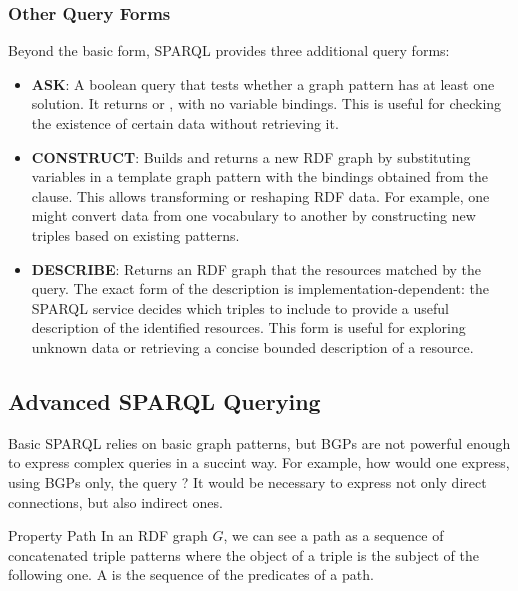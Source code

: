 \subsubsection{Other Query Forms}
Beyond the basic  form, SPARQL provides three additional query forms:

\begin{itemize}
    \item \textbf{ASK}: A boolean query that tests whether a graph pattern has at least one solution. It returns  or , with no variable bindings. This is useful for checking the existence of certain data without retrieving it.
    
    \item \textbf{CONSTRUCT}: Builds and returns a new RDF graph by substituting variables in a template graph pattern with the bindings obtained from the  clause. This allows transforming or reshaping RDF data. For example, one might convert data from one vocabulary to another by constructing new triples based on existing patterns.
    
    \item \textbf{DESCRIBE}: Returns an RDF graph that  the resources matched by the query. The exact form of the description is implementation-dependent: the SPARQL service decides which triples to include to provide a useful description of the identified resources. This form is useful for exploring unknown data or retrieving a concise bounded description of a resource.
\end{itemize}

\subsection{Advanced SPARQL Querying}
Basic SPARQL relies on basic graph patterns, but BGPs are not powerful enough to express complex queries in a succint way. For example, how would one express, using BGPs only, the query ? 
It would be necessary to express not only direct connections, but also indirect ones.

\begin{definition}{Property Path}
    In an RDF graph \(G\), we can see a path as a sequence of concatenated triple patterns where the object of a triple is the subject of the following one.
    A  is the sequence of the predicates of a path.
\end{definition}

